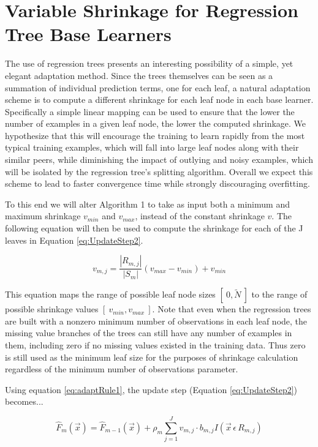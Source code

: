 \documentclass[9pt, conference]{IEEEtran}
\begin{document}
\section{Variable Shrinkage for Regression Tree Base Learners}
\label{sec:VariableLR}
The use of regression trees presents an interesting possibility of a simple, yet elegant adaptation method. Since the trees themselves can be seen as a summation of individual prediction terms, one for each leaf, a natural adaptation scheme is to compute a different shrinkage for each leaf node in each base learner. Specifically a simple linear mapping can be used to ensure that the lower the number of examples in a given leaf node, the lower the computed shrinkage. We hypothesize that this will encourage the training to learn rapidly from the most typical training examples, which will fall into large leaf nodes along with their similar peers, while diminishing the impact of outlying and noisy examples, which will be isolated by the regression tree's splitting algorithm. Overall we expect this scheme to lead to faster convergence time while strongly discouraging overfitting.

To this end we will alter Algorithm 1 to take as input both a minimum and maximum shrinkage \(v_{min}\) and \(v_{max}\), instead of the constant shrinkage \(v\). The following equation will then be used to compute the shrinkage for each of the J leaves in Equation \ref{eq:UpdateStep2}.
	
\begin{equation}
v_{m,j} = \frac{|R_{m,j}|}{{|S_m|}}(v_{max} - v_{min})  + v_{min}
	\label{eq:adaptRule1}
\end{equation}

This equation maps the range of possible leaf node sizes \([\ 0, \tilde{N}\ ]\) to the range of possible shrinkage values \([\ v_{min}, v_{max}\ ]\). Note that even when the regression trees are built with a nonzero minimum number of observations in each leaf node, the missing value branches of the trees can still have any number of examples in them, including zero if no missing values existed in the training data. Thus zero is still used as the minimum leaf size for the purposes of shrinkage calculation regardless of the minimum number of observations parameter. 

Using equation \ref{eq:adaptRule1}, the update step (Equation \ref{eq:UpdateStep2}) becomes...

\begin{equation}
	\hat{F}_m(\vec{x}) = \hat{F}_{m-1}(\vec{x}) + \rho_m\sum_{j=1}^{J}v_{m,j}  \cdot  b_{m,j}I(\vec{x} \, \epsilon \, R_{m,j})
	\label{eq:revisedUpdateStep}
\end{equation}
	
\end{document}
